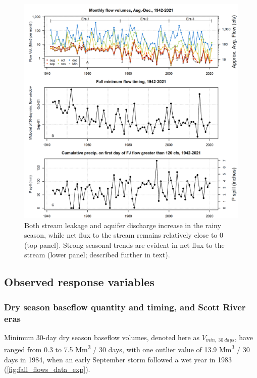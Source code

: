 \documentclass[
]{article}
\begin{document}
\begin{figure}
\includegraphics[width=1\linewidth]{f06} \caption{\label{fig:flow_to_aq_and_stream} Both stream leakage and aquifer discharge increase in the rainy season, while net flux to the stream remains relatively close to 0 (top panel). Strong seasonal trends are evident in net flux to the stream (lower panel; described further in text).}\label{fig:flow_to_aq_and_stream}
\end{figure}

\hypertarget{observed-response-variables}{%
\subsection{Observed response
variables}\label{observed-response-variables}}

\hypertarget{dry-season-baseflow-quantity-and-timing-and-scott-river-eras}{%
\subsubsection{Dry season baseflow quantity and timing, and Scott River
eras}\label{dry-season-baseflow-quantity-and-timing-and-scott-river-eras}}

Minimum 30-day dry season baseflow volumes, denoted here as
\(V_{min, ~30~days}\), have ranged from 0.3 to 7.5 Mm\textsuperscript{3}
/ 30 days, with one outlier value of 13.9 Mm\textsuperscript{3} / 30
days in 1984, when an early September storm followed a wet year in 1983
(\autoref{fig:fall_flows_data_exp}).
\end{document}
